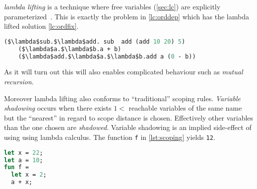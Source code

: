 \documentclass[11pt,oneside,a4paper]{report}
\begin{document}
\textit{lambda lifting} is a technique where free variables (\autoref{sec:lc}) are explicitly parameterized~\cite{johnsson1985lambda}.
This is exactly the problem in \autoref{lc:orddep} which has the lambda lifted solution \autoref{lc:ordfix}.
\begin{lstlisting}[language=ML,caption={Order dependent},label={lc:ordfix},mathescape=true]
($\lambda$sub.$\lambda$add. sub  add (add 10 20) 5) 
    ($\lambda$a.$\lambda$b.a + b) 
    ($\lambda$add.$\lambda$a.$\lambda$b.add a (0 - b))
\end{lstlisting}
As it will turn out this will also enables complicated behaviour such as \textit{mutual recursion}.

Moreover lambda lifting also conforms to ``traditional'' scoping rules.
\textit{Variable shadowing} occurs when there exists $1 < $ reachable variables of the same name but the ``nearest'' in regard to scope distance is chosen.
Effectively other variables than the one chosen are \textit{shadowed}.
Variable shadowing is an implied side-effect of using using lambda calculus.
The function \texttt{f} in \autoref{lst:scoping} yields \texttt{12}.
\begin{lstlisting}[language=ML,caption={Scoping rules in programming languages},label={lst:scoping}]
let x = 22;
let a = 10;
fun f = 
  let x = 2;
  a + x;
\end{lstlisting}
\end{document}
